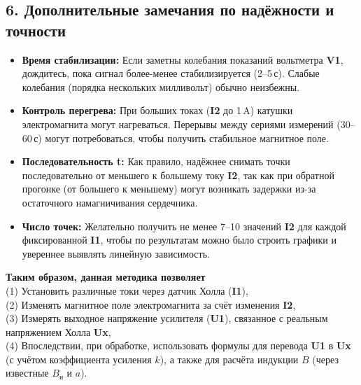 \documentclass[12pt,a4paper]{article}
\begin{document}
\subsection*{6. Дополнительные замечания по надёжности и точности}

\begin{itemize}
    \item \textbf{Время стабилизации:} Если заметны колебания показаний вольтметра \textbf{V1}, дождитесь, пока сигнал более-менее стабилизируется (2--5\,с). Слабые колебания (порядка нескольких милливольт) обычно неизбежны.
    \item \textbf{Контроль перегрева:} При больших токах (\textbf{I2} до 1\,A) катушки электромагнита могут нагреваться. Перерывы между сериями измерений (30--60\,с) могут потребоваться, чтобы получить стабильное магнитное поле.
    \item \textbf{Последовательность t:} Как правило, надёжнее снимать точки последовательно от меньшего к большему току \textbf{I2}, так как при обратной прогонке (от большего к меньшему) могут возникать задержки из-за остаточного намагничивания сердечника.
    \item \textbf{Число точек:} Желательно получить не менее 7--10 значений \textbf{I2} для каждой фиксированной \textbf{I1}, чтобы по результатам можно было строить графики и увереннее выявлять линейную зависимость.
\end{itemize}

\bigskip

\noindent
\textbf{Таким образом, данная методика позволяет}\\
(1) Установить различные токи через датчик Холла (\textbf{I1}), \\
(2) Изменять магнитное поле электромагнита за счёт изменения \textbf{I2}, \\
(3) Измерять выходное напряжение усилителя (\textbf{U1}), связанное с реальным напряжением Холла \textbf{Ux}, \\
(4) Впоследствии, при обработке, использовать формулы для перевода \textbf{U1} в \textbf{Ux} (с учётом коэффициента усиления $k$), а также для расчёта индукции $B$ (через известные $B_{\text{н}}$ и $a$).
\end{document}
